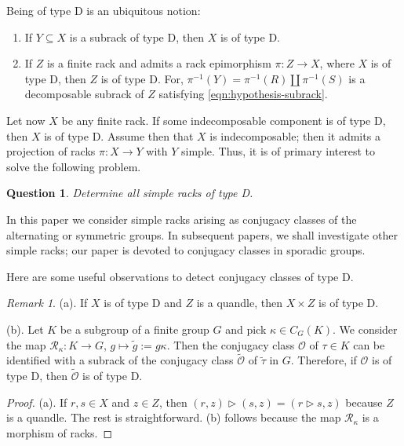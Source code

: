 \documentclass[11pt]{amsart} \textheight 22cm
\renewcommand{\^}[1]{\mbox{$^{\left( #1 \right)}$}}
\renewcommand{\_}[1]{\mbox{$_{\left( #1 \right)}$}}
\newcommand{\trid}{\triangleright}
\newcommand{\R}{{\mathcal R}}
\newcommand{\oc}{{\mathcal O}}
\theoremstyle{plain}
\newtheorem{question}{Question}
\theoremstyle{definition}
\theoremstyle{remark}
\newtheorem{obs}[lema]{Remark}
\def\pf{\begin{proof}}
\def\epf{\end{proof}}
\theoremstyle{remark}
\begin{document}
Being of type D is an ubiquitous notion:

    \begin{enumerate}


\medbreak\item If $Y\subseteq X$ is a subrack of type D, then $X$
is of type D.


\medbreak\item If $Z$ is a finite rack and admits a rack
            epimorphism $\pi: Z\to X$, where $X$ is of type D, then $Z$
            is of type D. For, $\pi^{-1}(Y) = \pi^{-1}(R)\coprod \pi^{-1}(S)$ is a decomposable
            subrack of $Z$ satisfying \eqref{eqn:hypothesis-subrack}.
   \end{enumerate}

Let now $X$ be any finite rack. If some indecomposable component
\cite[Prop. 1.17]{AG1} is of type D, then $X$ is of type D. Assume
then that $X$ is indecomposable; then it admits a projection of
racks $\pi: X \to Y$ with $Y$ simple. Thus, it is of primary
interest to solve the following problem.


\begin{question}\label{que:rackssimples-typeD}
Determine all simple racks of type D.
\end{question}

In this paper we consider simple racks arising as conjugacy
classes of the alternating or symmetric groups. In subsequent
papers, we shall investigate other simple racks;  our paper
\cite{afgv-spor} is devoted to conjugacy classes in sporadic
groups.

\medbreak Here are some useful observations to detect conjugacy
classes of type D.
\begin{obs}\label{obs:simplequotients3}
    (a). If $X$ is of type D and $Z$ is a quandle, then $X \times Z$ is of type D.

    (b). Let $K$ be a subgroup of a finite group $G$ and pick $\kappa\in C_G(K)$. We
    consider the map $\R_{\kappa}: K\to G$, $g\mapsto \widetilde g := g\kappa$. Then the
    conjugacy class $\oc$ of $\tau\in K$ can be identified with a subrack of the conjugacy
    class $\widetilde{\oc}$ of $\widetilde{\tau}$ in $G$. Therefore, if $\oc$ is of type D,
    then $\widetilde{\oc}$ is of type D.
\end{obs}

\pf (a). If $r,s\in X$ and $z\in Z$, then $(r,z)\trid (s,z) =
(r\trid s,z)$ because $Z$ is a quandle. The rest is
straightforward. (b) follows because the map $\R_{\kappa}$ is a morphism of racks.
\epf
\end{document}
